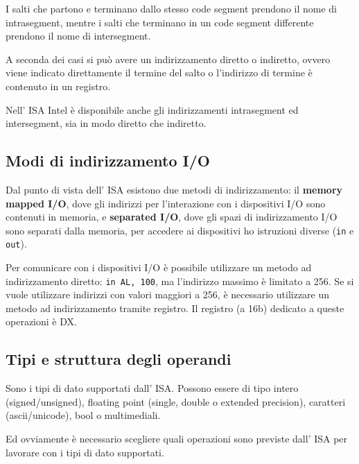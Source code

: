 \documentclass[../ace.tex]{subfiles}
\begin{document}
I salti che partono e terminano dallo stesso code segment prendono il nome di intrasegment,
mentre i salti che terminano in un code segment differente prendono il nome di intersegment.

A seconda dei casi si può avere un indirizzamento diretto o indiretto, ovvero viene indicato
direttamente il termine del salto o l'indirizzo di termine è contenuto in un registro.

Nell' ISA Intel è disponibile anche gli indirizzamenti intrasegment ed intersegment, sia in modo diretto che indiretto.


\subsection{Modi di indirizzamento I/O}
Dal punto di vista dell' ISA esistono due metodi di indirizzamento: il \textbf{memory mapped I/O},
dove gli indirizzi per l'interazione con i dispositivi I/O sono contenuti in memoria,
e \textbf{separated I/O}, dove gli spazi di indirizzamento I/O sono separati dalla memoria,
per accedere ai dispositivi ho istruzioni diverse (\lstinline{in} e \lstinline{out}).

Per comunicare con i dispositivi I/O è possibile utilizzare un metodo ad indirizzamento
diretto: \lstinline{in AL, 100}, ma l'indirizzo massimo è limitato a 256.
Se si vuole utilizzare indirizzi con valori maggiori a 256, è necessario utilizzare un metodo
ad indirizzamento tramite registro. Il registro (a 16b) dedicato a queste operazioni è DX.

\subsection{Tipi e struttura degli operandi}
Sono i tipi di dato supportati dall' ISA. Possono essere di tipo intero (signed/unsigned), floating point
(single, double o extended precision), caratteri (ascii/unicode), bool o multimediali.

Ed ovviamente è necessario scegliere quali operazioni sono previste dall' ISA per lavorare con
i tipi di dato supportati.
\end{document}
